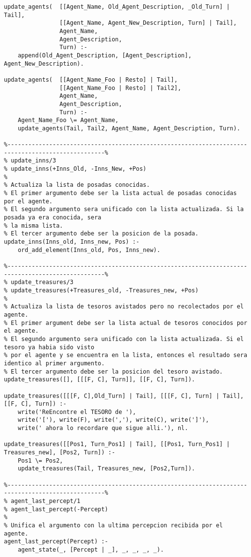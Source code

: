 \documentclass[a4paper,12pt]{report}
\begin{document}
\begin{scriptsize}
\begin{verbatim}
update_agents(  [[Agent_Name, Old_Agent_Description, _Old_Turn] | Tail], 
                [[Agent_Name, Agent_New_Description, Turn] | Tail], 
                Agent_Name, 
                Agent_Description, 
                Turn) :-
    append(Old_Agent_Description, [Agent_Description], Agent_New_Description).
    
update_agents(  [[Agent_Name_Foo | Resto] | Tail], 
                [[Agent_Name_Foo | Resto] | Tail2], 
                Agent_Name, 
                Agent_Description, 
                Turn) :-
    Agent_Name_Foo \= Agent_Name,
    update_agents(Tail, Tail2, Agent_Name, Agent_Description, Turn).

%--------------------------------------------------------------------------------------------------%
% update_inns/3
% update_inns(+Inns_Old, -Inns_New, +Pos)
%
% Actualiza la lista de posadas conocidas. 
% El primer argumento debe ser la lista actual de posadas conocidas por el agente. 
% El segundo argumento sera unificado con la lista actualizada. Si la posada ya era conocida, sera
% la misma lista. 
% El tercer argumento debe ser la posicion de la posada.
update_inns(Inns_old, Inns_new, Pos) :- 
    ord_add_element(Inns_old, Pos, Inns_new).

%--------------------------------------------------------------------------------------------------%
% update_treasures/3
% update_treasures(+Treasures_old, -Treasures_new, +Pos)
% 
% Actualiza la lista de tesoros avistados pero no recolectados por el agente. 
% El primer argument debe ser la lista actual de tesoros conocidos por el agente. 
% El segundo argumento sera unificado con la lista actualizada. Si el tesoro ya habia sido visto
% por el agente y se encuentra en la lista, entonces el resultado sera identico al primer argumento.
% El tercer argumento debe ser la posicion del tesoro avistado.
update_treasures([], [[[F, C], Turn]], [[F, C], Turn]).

update_treasures([[[F, C],Old_Turn] | Tail], [[[F, C], Turn] | Tail], [[F, C], Turn]) :- 
    write('ReEncontre el TESORO de '), 
    write('['), write(F), write(','), write(C), write(']'), 
    write(' ahora lo recordare que sigue alli.'), nl.

update_treasures([[Pos1, Turn_Pos1] | Tail], [[Pos1, Turn_Pos1] | Treasures_new], [Pos2, Turn]) :- 
    Pos1 \= Pos2, 
    update_treasures(Tail, Treasures_new, [Pos2,Turn]).

%--------------------------------------------------------------------------------------------------%
% agent_last_percept/1
% agent_last_percept(-Percept)
%
% Unifica el argumento con la ultima percepcion recibida por el agente.
agent_last_percept(Percept) :- 
    agent_state(_, [Percept | _], _, _, _, _).


\end{verbatim}
\end{scriptsize}
\end{document}
